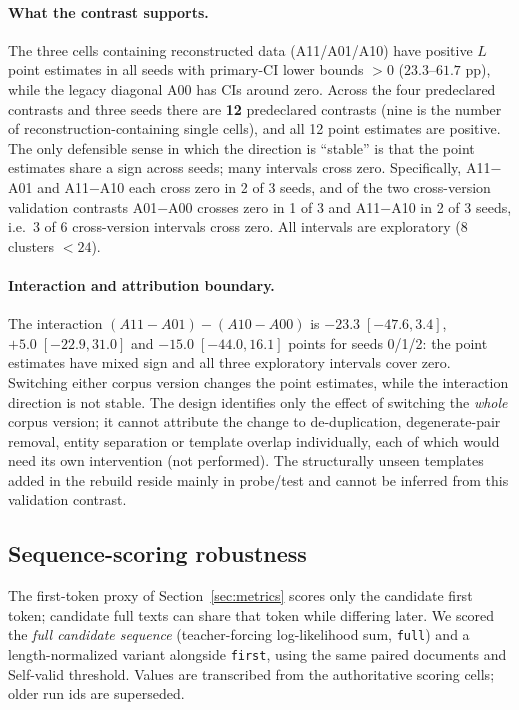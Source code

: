 \documentclass[11pt,a4paper]{article}
\begin{document}
\paragraph{What the contrast supports.} The three cells containing
reconstructed data (A11/A01/A10) have positive $L$ point estimates in all seeds
with primary-CI lower bounds $>0$ ($23.3$--$61.7$ pp), while the legacy diagonal
A00 has CIs around zero. Across the four predeclared contrasts and three seeds
there are \textbf{12} predeclared contrasts (nine is the number of
reconstruction-containing single cells), and all 12 point estimates are
positive. The only defensible sense in which the direction is ``stable'' is
that the point estimates share a sign across seeds; many intervals cross zero.
Specifically, A11$-$A01 and A11$-$A10 each cross zero in 2 of 3 seeds, and of
the two cross-version validation contrasts A01$-$A00 crosses zero in 1 of 3 and
A11$-$A10 in 2 of 3 seeds, i.e.\ 3 of 6 cross-version intervals cross zero.
All intervals are exploratory (8 clusters $<24$).

\paragraph{Interaction and attribution boundary.} The interaction
$(A11-A01)-(A10-A00)$ is $-23.3\;[-47.6,3.4]$, $+5.0\;[-22.9,31.0]$ and
$-15.0\;[-44.0,16.1]$ points for seeds 0/1/2: the point estimates have mixed
sign and all three exploratory intervals cover zero. Switching either corpus
version changes the point estimates, while the interaction direction is not
stable. The design identifies only the effect of switching the \emph{whole}
corpus version; it cannot attribute the change to de-duplication,
degenerate-pair removal, entity separation or template overlap individually,
each of which would need its own intervention (not performed). The structurally
unseen templates added in the rebuild reside mainly in probe/test and cannot be
inferred from this validation contrast.

\subsection{Sequence-scoring robustness}
\label{sec:seqscore}

The first-token proxy of Section~\ref{sec:metrics} scores only the candidate
first token; candidate full texts can share that token while differing later.
We scored the \emph{full candidate sequence} (teacher-forcing log-likelihood
sum, \texttt{full}) and a length-normalized variant alongside \texttt{first},
using the same paired documents and Self-valid threshold. Values are
transcribed from the authoritative scoring cells; older run ids are
superseded.
\end{document}
